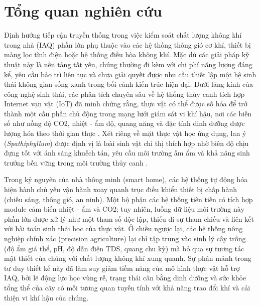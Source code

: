\section{Tổng quan nghiên cứu}
Định hướng tiếp cận truyền thống trong việc kiểm soát chất lượng không khí trong nhà (IAQ) phần lớn phụ thuộc vào các hệ thống thông gió cơ khí, thiết bị màng lọc tĩnh điện hoặc hệ thống điều hòa không khí. Mặc dù các giải pháp kỹ thuật này là nền tảng tất yếu, chúng thường đi kèm với chi phí năng lượng đáng kể, yêu cầu bảo trì liên tục và chưa giải quyết được nhu cầu thiết lập một hệ sinh thái không gian sống xanh trong bối cảnh kiến trúc hiện đại. Dưới lăng kính của công nghệ sinh thái, các phân tích chuyên sâu về hệ thống thủy canh tích hợp Internet vạn vật (IoT) đã minh chứng rằng, thực vật có thể được số hóa để trở thành một cấu phần chủ động trong mạng lưới giám sát vi khí hậu, nơi các biến số như nồng độ CO2, nhiệt - ẩm độ, quang năng và đặc tính dinh dưỡng được lượng hóa theo thời gian thực \cite{hydroponic_iaq_survey}. Xét riêng về mặt thực vật học ứng dụng, lan ý (\textit{Spathiphyllum}) được định vị là loài sinh vật chỉ thị thích hợp nhờ biên độ chịu đựng tốt với ánh sáng khuếch tán, yêu cầu môi trường ấm ẩm và khả năng sinh trưởng bền vững trong môi trường thủy canh \cite{peace_lily_care_bhg,peace_lily_hydro_brightlane}.

Trong kỷ nguyên của nhà thông minh (smart home), các hệ thống tự động hóa hiện hành chủ yếu vận hành xoay quanh trục điều khiển thiết bị chấp hành (chiếu sáng, thông gió, an ninh). Một bộ phận các hệ thống tiên tiến có tích hợp module cảm biến nhiệt - ẩm và CO2; tuy nhiên, luồng dữ liệu môi trường này phần lớn được xử lý như một tham số độc lập, thiếu đi sự tham chiếu và liên kết với bài toán sinh thái học của thực vật. Ở chiều ngược lại, các hệ thống nông nghiệp chính xác (precision agriculture) lại chỉ tập trung vào sinh lý cây trồng (độ ẩm giá thể, pH, độ dẫn điện TDS, quang chu kỳ) mà bỏ qua sự tương tác mật thiết của chúng với chất lượng không khí xung quanh. Sự phân mảnh trong tư duy thiết kế này đã làm suy giảm tiềm năng của mô hình thực vật hỗ trợ IAQ, bởi lẽ động lực học vùng rễ, trạng thái cân bằng dinh dưỡng và sức khỏe tổng thể của cây có mối tương quan tuyến tính với khả năng trao đổi khí và cải thiện vi khí hậu của chúng.

